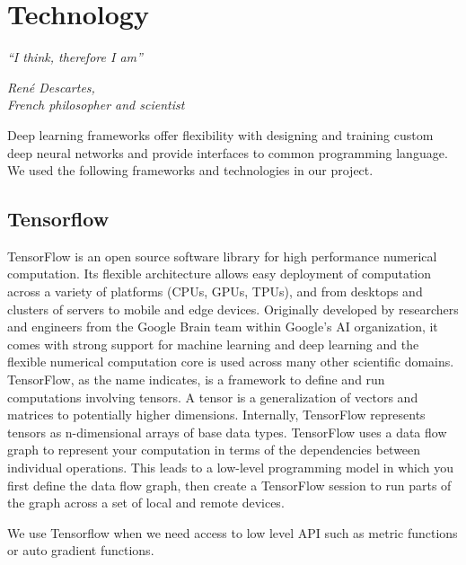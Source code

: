 \chapter{Technology}\label{ch:technology}
\epigraph{\textit{\normalsize“I think, therefore I am”}}{\textit{ \normalsize René Descartes,\\ French philosopher and scientist}}
Deep learning frameworks offer flexibility with designing and training custom deep neural networks and provide interfaces to common programming language. We used the following frameworks and technologies in our project.

\section{Tensorflow} %
\label{sec:tensorflow}
TensorFlow is an open source software library for high performance numerical computation. Its flexible architecture allows easy deployment of computation across a variety of platforms (CPUs, GPUs, TPUs), and from desktops and clusters of servers to mobile and edge devices. Originally developed by researchers and engineers from the Google Brain team within Google’s AI organization, it comes with strong support for machine learning and deep learning and the flexible numerical computation core is used across many other scientific domains. TensorFlow, as the name indicates, is a framework to define and run computations involving tensors. A tensor is a generalization of vectors and matrices to potentially higher dimensions. Internally, TensorFlow represents tensors as n-dimensional arrays of base data types. TensorFlow uses a data flow graph to represent your computation in terms of the dependencies between individual operations. This leads to a low-level programming model in which you first define the data flow graph, then create a TensorFlow session to run parts of the graph across a set of local and remote devices.\par\bigskip
We use Tensorflow when we need access to low level API such as metric functions or auto gradient functions.

